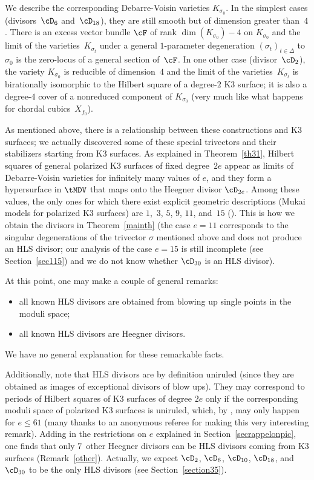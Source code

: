 We describe the corresponding Debarre-Voisin varieties $K_{\sigma_0}$.
In the simplest cases (divisors~$\cD_6$ and~$\cD_{18}$), they are still smooth but of dimension greater than~$4$. There is an excess vector
bundle $\cF$ of rank $\dim( K_{\sigma_0})-4$ on $K_{\sigma_0}$
and
the limit of the varieties~$K_{\sigma_t}$ under a general $1$-parameter degeneration $ (\sigma_t)_{t\in \Delta}$ to $\sigma_0$
is the zero-locus of a general section of~$\cF$. In one other case (divisor~$\cD_2$), the variety $K_{\sigma_0}$ is reducible of dimension~$4$ and the limit of the varieties~$K_{\sigma_t}$ is birationally isomorphic to the Hilbert square of a degree-$2$ K3 surface; it is also a degree-$4$ cover of a nonreduced component of $K_{\sigma_0}$ (very much like what happens for chordal cubics~$X_{f_0}$).

As mentioned above, there is a relationship between these constructions and K3 surfaces; we actually discovered some of these special trivectors and their stabilizers starting from K3 surfaces.
As explained in Theorem~\ref{th31}, Hilbert squares of general polarized K3
surfaces of fixed degree~$2e$
appear as limits
of Debarre-Voisin varieties for infinitely many values of $e$, and they form a hypersurface in $\tMDV$ that maps onto the Heegner divisor $\cD_{2e}$. Among these values, the only ones for which there exist explicit geometric descriptions (Mukai models for polarized K3 surfaces) are
$1$,~$3$, $5$, $9$, $11$, and~$15$ (\cite{mukai,mukai2,mukai3}). This is how we obtain the divisors in Theorem~\ref{mainth} (the case \mbox{$e=11$} corresponds to the singular degenerations of the trivector $\sigma$ mentioned above and does not produce an HLS divisor; our analysis of the case $e=15$ is still incomplete (see Section~\ref{sec115}) and we do not know whether $\cD_{30}$ is an HLS divisor).

At this point, one may make a couple of general remarks:
\begin{itemize}
\item all known HLS divisors are obtained from blowing up single points in the moduli space;
\item all known HLS divisors are Heegner divisors.
\end{itemize}
We have no general explanation for these remarkable facts.

Additionally, note that HLS divisors are by definition uniruled (since they are obtained as images of exceptional divisors of blow ups). They may correspond to periods of Hilbert squares of K3 surfaces of degree $2e$ only if the corresponding moduli space of polarized K3 surfaces is uniruled, which, by \cite{ghs}, may only happen for $e\le 61$ (many thanks to an anonymous referee for making this very interesting remark). Adding in the restrictions on $e$ explained in Section~\ref{secrappelonpic}, one finds that only 7~other Heegner divisors can be HLS divisors coming from K3 surfaces (Remark~\ref{other}). Actually, we expect $\cD_2$, $\cD_6$, $\cD_{10}$, $\cD_{18}$, and $\cD_{30}$ to be the only HLS divisors (see Section~\ref{section35}).

